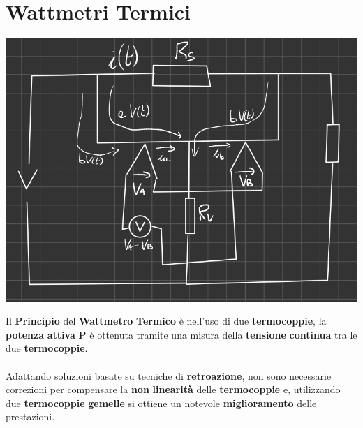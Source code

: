 \section{Wattmetri Termici}
\begin{center}
    \includegraphics[width=.7\textwidth]{Images/figure49.png}
\end{center}
Il \textbf{Principio} del \textbf{Wattmetro} \textbf{Termico} è nell'uso di due \textbf{termocoppie}, la \textbf{potenza} \textbf{attiva} \textbf{P} è ottenuta tramite una misura della \textbf{tensione} \textbf{continua}  tra le due \textbf{termocoppie}.\\ \\
Adattando soluzioni basate su tecniche di \textbf{retroazione}, non sono necessarie correzioni per compensare la \textbf{non} \textbf{linearità} delle \textbf{termocoppie} e, utilizzando due \textbf{termocoppie} \textbf{gemelle} si ottiene un notevole \textbf{miglioramento} delle prestazioni.\\ 
